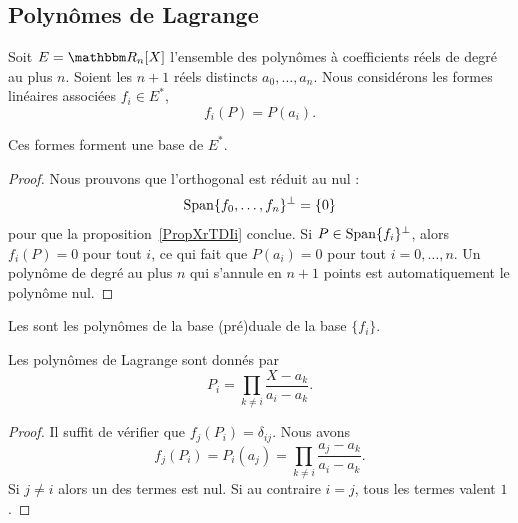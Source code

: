 \subsection{Polynômes de Lagrange}

Soit \( E=\eR_n[X]\) l'ensemble des polynômes à coefficients réels de degré au plus \( n\). Soient les \( n+1\) réels distincts \( a_0,\ldots, a_n\). Nous considérons les formes linéaires associées \( f_i\in E^*\),
\begin{equation}
    f_i(P)=P(a_i).
\end{equation}
\begin{lemma}
    Ces formes forment une base de \( E^*\).
\end{lemma}

\begin{proof}
    Nous prouvons que l'orthogonal est réduit au nul :
    \begin{equation}
        \operatorname{Span}\{ f_0,\ldots, f_n \}^{\perp}=\{ 0 \}
    \end{equation}
    pour que la proposition~\ref{PropXrTDIi} conclue. Si \( P\in\operatorname{Span}\{ f_i \}^{\perp}\), alors \( f_i(P)=0\) pour tout \( i\), ce qui fait que \( P(a_i)=0\) pour tout \( i=0,\ldots, n\). Un polynôme de degré au plus \( n\) qui s'annule en \( n+1\) points est automatiquement le polynôme nul.
\end{proof}

Les  sont les polynômes de la base (pré)duale de la base \( \{ f_i \}\).

\begin{proposition}
    Les polynômes de Lagrange sont donnés par
    \begin{equation}
        P_i=\prod_{k\neq i}\frac{ X-a_k }{ a_i-a_k }.
    \end{equation}
\end{proposition}

\begin{proof}
    Il suffit de vérifier que \( f_j(P_i)=\delta_{ij}\). Nous avons
    \begin{equation}
        f_j(P_i)=P_i(a_j)=\prod_{k\neq i}\frac{ a_j-a_k }{ a_i-a_k }.
    \end{equation}
    Si \( j\neq i\) alors un des termes est nul. Si au contraire \( i=j\), tous les termes valent \( 1\).
\end{proof}


